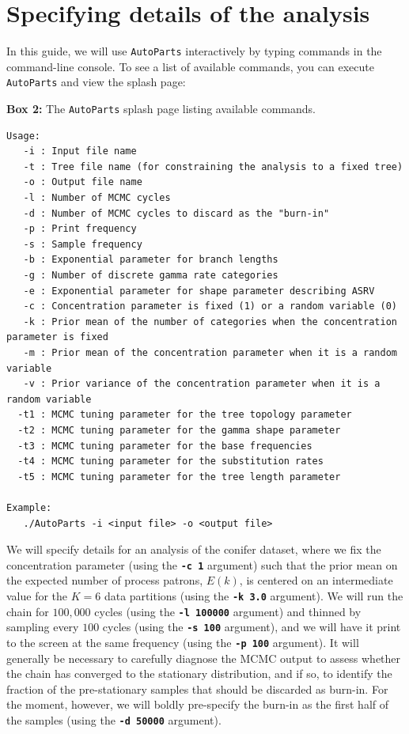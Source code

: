 \documentclass[11pt]{article}
\newcommand{\cl}[1]{{\texttt{\textbf{#1}}}}
\begin{document}
\newpage
\section*{Specifying details of the analysis}

In this guide, we will use \verb!AutoParts! interactively by typing commands in the command-line console.
To see a list of available commands, you can execute \verb!AutoParts! and view the splash page:

\begin{center}
{\bf Box 2:} The \verb!AutoParts! splash page listing available commands. \\
\end{center}
{\tt \scriptsize \begin{framed}
\begin{lstlisting}
Usage:
   -i : Input file name
   -t : Tree file name (for constraining the analysis to a fixed tree)
   -o : Output file name
   -l : Number of MCMC cycles
   -d : Number of MCMC cycles to discard as the "burn-in"
   -p : Print frequency
   -s : Sample frequency
   -b : Exponential parameter for branch lengths
   -g : Number of discrete gamma rate categories
   -e : Exponential parameter for shape parameter describing ASRV
   -c : Concentration parameter is fixed (1) or a random variable (0)
   -k : Prior mean of the number of categories when the concentration parameter is fixed
   -m : Prior mean of the concentration parameter when it is a random variable
   -v : Prior variance of the concentration parameter when it is a random variable
  -t1 : MCMC tuning parameter for the tree topology parameter
  -t2 : MCMC tuning parameter for the gamma shape parameter
  -t3 : MCMC tuning parameter for the base frequencies
  -t4 : MCMC tuning parameter for the substitution rates
  -t5 : MCMC tuning parameter for the tree length parameter

Example:
   ./AutoParts -i <input file> -o <output file>
\end{lstlisting}
\end{framed}}

We will specify details for an analysis of the conifer dataset, where we fix the concentration parameter (using the \cl{-c 1} argument) such that the prior mean on the expected number of process patrons, $E(k)$, is centered on an intermediate value for the $K=6$ data partitions (using the \cl{-k 3.0} argument).
We will run the chain for $100,000$ cycles (using the \cl{-l 100000} argument) and thinned by sampling every $100$ cycles (using the \cl{-s 100} argument), and we will have it print to the screen at the same frequency (using the \cl{-p 100} argument).
It will generally be necessary to carefully diagnose the MCMC output to assess whether the chain has converged to the stationary distribution, and if so, to identify the fraction of the pre-stationary samples that should be discarded as burn-in.
For the moment, however, we  will boldly pre-specify the burn-in as the first half of the samples (using the \cl{-d 50000} argument).
\end{document}
